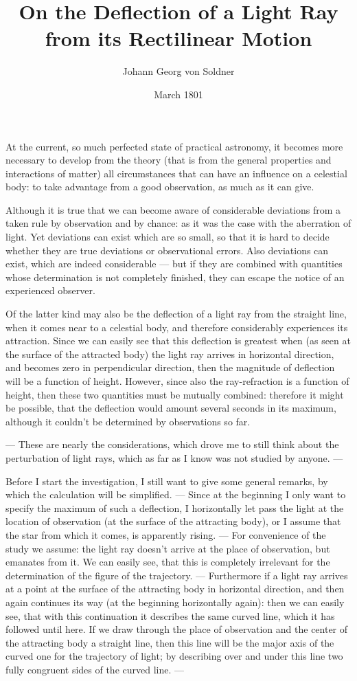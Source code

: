 \documentclass{article}
\title{On the Deflection of a Light Ray from its Rectilinear Motion}
\author{Johann Georg von Soldner}
\date{March 1801}
\begin{document}
\maketitle

At the current, so much perfected state of practical astronomy, it becomes more necessary to develop from the theory (that is from the general properties and interactions of matter) all circumstances that can have an influence on a celestial body: to take advantage from a good observation, as much as it can give.

Although it is true that we can become aware of considerable deviations from a taken rule by observation and by chance: as it was the case with the aberration of light. Yet deviations can exist which are so small, so that it is hard to decide whether they are true deviations or observational errors. Also deviations can exist, which are indeed considerable — but if they are combined with quantities whose determination is not completely finished, they can escape the notice of an experienced observer.

Of the latter kind may also be the deflection of a light ray from the straight line, when it comes near to a celestial body, and therefore considerably experiences its attraction. Since we can easily see that this deflection is greatest when (as seen at the surface of the attracted body) the light ray arrives in horizontal direction, and becomes zero in perpendicular direction, then the magnitude of deflection will be a function of height. However, since also the ray-refraction is a function of height, then these two quantities must be mutually combined: therefore it might be possible, that the deflection would amount several seconds in its maximum, although it couldn't be determined by observations so far.

— These are nearly the considerations, which drove me to still think about the perturbation of light rays, which as far as I know was not studied by anyone. —

Before I start the investigation, I still want to give some general remarks, by which the calculation will be simplified. — Since at the beginning I only want to specify the maximum of such a deflection, I horizontally let pass the light at the location of observation (at the surface of the attracting body), or I assume that the star from which it comes, is apparently rising. — For convenience of the study we assume: the light ray doesn't arrive at the place of observation, but emanates from it. We can easily see, that this is completely irrelevant for the determination of the figure of the trajectory. — Furthermore if a light ray arrives at a point at the surface of the attracting body in horizontal direction, and then again continues its way (at the beginning horizontally again): then we can easily see, that with this continuation it describes the same curved line, which it has followed until here. If we draw through the place of observation and the center of the attracting body a straight line, then this line will be the major axis of the curved one for the trajectory of light; by describing over and under this line two fully congruent sides of the curved line. —
\end{document}
